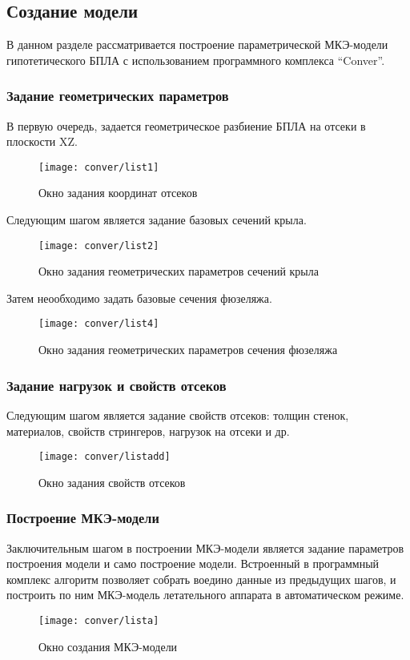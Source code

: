 \subsection{Создание модели}
\label{sec:creationOfOneModel}

В данном разделе рассматривается построение параметрической МКЭ-модели гипотетического БПЛА с использованием программного комплекса ``Conver''. 

\subsubsection{Задание геометрических параметров}
В первую очередь, задается геометрическое разбиение БПЛА на отсеки в плоскости XZ. 

\begin{figure}[H]
\centering
\texttt{[image: conver/list1]}
\caption{Окно задания координат отсеков}
\label{fig:conver_list1}
\end{figure}


Следующим шагом является задание базовых сечений крыла.

\begin{figure}[H]
\centering
\texttt{[image: conver/list2]}
\caption{Окно задания геометрических параметров сечений крыла}
\label{fig:conver_list2}
\end{figure} 

Затем неообходимо задать базовые сечения фюзеляжа.

\begin{figure}[H]
\centering
\texttt{[image: conver/list4]}
\caption{Окно задания геометрических параметров сечения фюзеляжа}
\label{fig:conver_list4}
\end{figure}

\subsubsection{Задание нагрузок и свойств отсеков}

Следующим шагом является задание свойств отсеков: толщин стенок, материалов, свойств стрингеров, нагрузок на отсеки и др. 

\begin{figure}[H]
\centering
\texttt{[image: conver/listadd]}
\caption{Окно задания свойств отсеков}
\label{fig:conver_listadd}
\end{figure}

\subsubsection{Построение МКЭ-модели}

Заключительным шагом в построении МКЭ-модели является задание параметров построения модели и само построение модели. Встроенный в программный комплекс алгоритм позволяет собрать воедино данные из предыдущих шагов, и построить по ним МКЭ-модель летательного аппарата в автоматическом режиме. 

\begin{figure}[H]
\centering
\texttt{[image: conver/lista]}
\caption{Окно создания МКЭ-модели}
\label{fig:conver_lista}
\end{figure}
